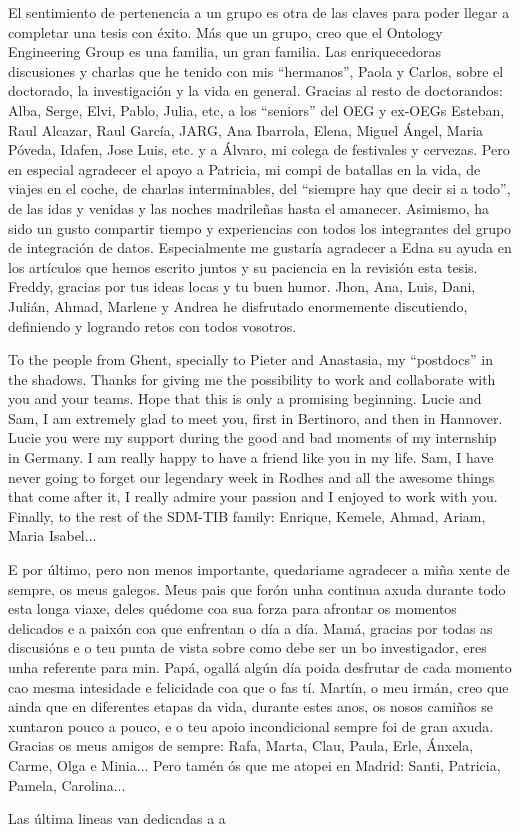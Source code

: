 \begin{acknowledgementslong}
El sentimiento de pertenencia a un grupo es otra de las claves para poder llegar a completar una tesis con éxito. Más que un grupo, creo que el Ontology Engineering Group es una familia, un gran familia. Las enriquecedoras discusiones y charlas que he tenido con mis ``hermanos'', Paola y Carlos, sobre el doctorado, la investigación y la vida en general. Gracias al resto de doctorandos: Alba, Serge, Elvi, Pablo, Julia, etc, a los ``seniors'' del OEG y ex-OEGs Esteban, Raul Alcazar, Raul García, JARG, Ana Ibarrola, Elena, Miguel Ángel, Maria Póveda, Idafen, Jose Luis, etc. y a Álvaro, mi colega de festivales y cervezas. Pero en especial agradecer el apoyo a Patricia, mi compi de batallas en la vida, de viajes en el coche, de charlas interminables, del ``siempre hay que decir si a todo'', de las idas y venidas y las noches madrileñas hasta el amanecer. Asimismo, ha sido un gusto compartir tiempo y experiencias con todos los integrantes del grupo de integración de datos. Especialmente me gustaría agradecer a Edna su ayuda en los artículos que hemos escrito juntos y su paciencia en la revisión esta tesis. Freddy, gracias por tus ideas locas y tu buen humor. Jhon, Ana, Luis, Dani, Julián, Ahmad, Marlene y Andrea he disfrutado enormemente discutiendo, definiendo y logrando retos con todos vosotros. 

To the people from Ghent, specially to Pieter and Anastasia, my ``postdocs'' in the shadows. Thanks for giving me the possibility to work and collaborate with you and your teams. Hope that this is only a promising beginning. Lucie and Sam, I am extremely glad to meet you, first in Bertinoro, and then in Hannover. Lucie you were my support during the good and bad moments of my internship in Germany. I am really happy to have a friend like you in my life. Sam, I have never going to forget our legendary week in Rodhes and all the awesome things that come after it, I really admire your passion and I enjoyed to work with you. Finally, to the rest of the SDM-TIB family: Enrique, Kemele, Ahmad, Ariam, Maria Isabel...

E por último, pero non menos importante, quedariame agradecer a miña xente de sempre, os meus galegos. Meus pais que forón unha continua axuda durante todo esta longa viaxe, deles quédome coa sua forza para afrontar os momentos delicados e a paixón coa que enfrentan o día a día. Mamá, gracias por todas as discusións e o teu punta de vista sobre como debe ser un bo investigador, eres unha referente para min. Papá, ogallá algún día poida desfrutar de cada momento cao mesma intesidade e felicidade coa que o fas tí. Martín, o meu irmán, creo que ainda que en diferentes etapas da vida, durante estes anos, os nosos camiños se xuntaron pouco a pouco, e o teu apoio incondicional sempre foi de gran axuda. Gracias os meus amigos de sempre: Rafa, Marta, Clau, Paula, Erle, Ánxela, Carme, Olga e Minia... Pero tamén ós que me atopei en Madrid: Santi, Patricia, Pamela, Carolina...

Las última lineas van dedicadas a a




\end{acknowledgementslong}




